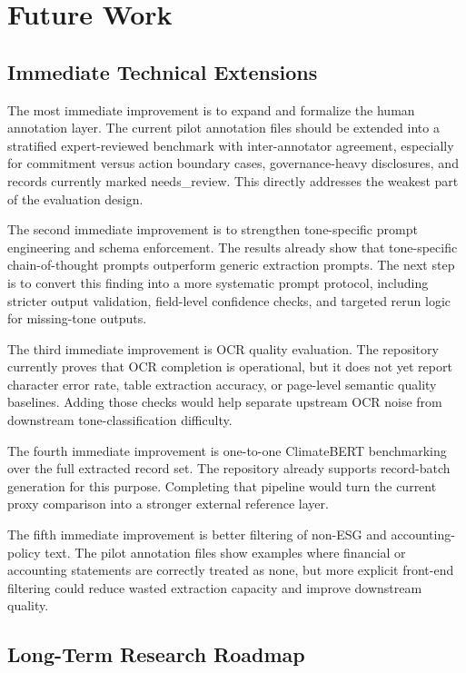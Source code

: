 \documentclass[english, online, cse, master]{dithesis}
\begin{document}
\section{Future Work}
\subsection{Immediate Technical Extensions}

The most immediate improvement is to expand and formalize the human annotation layer. The current pilot annotation files should be extended into a stratified expert-reviewed benchmark with inter-annotator agreement, especially for commitment versus action boundary cases, governance-heavy disclosures, and records currently marked needs\_review. This directly addresses the weakest part of the evaluation design.

The second immediate improvement is to strengthen tone-specific prompt engineering and schema enforcement. The results already show that tone-specific chain-of-thought prompts outperform generic extraction prompts. The next step is to convert this finding into a more systematic prompt protocol, including stricter output validation, field-level confidence checks, and targeted rerun logic for missing-tone outputs.

The third immediate improvement is OCR quality evaluation. The repository currently proves that OCR completion is operational, but it does not yet report character error rate, table extraction accuracy, or page-level semantic quality baselines. Adding those checks would help separate upstream OCR noise from downstream tone-classification difficulty.

The fourth immediate improvement is one-to-one ClimateBERT benchmarking over the full extracted record set. The repository already supports record-batch generation for this purpose. Completing that pipeline would turn the current proxy comparison into a stronger external reference layer.

The fifth immediate improvement is better filtering of non-ESG and accounting-policy text. The pilot annotation files show examples where financial or accounting statements are correctly treated as none, but more explicit front-end filtering could reduce wasted extraction capacity and improve downstream quality.

\subsection{Long-Term Research Roadmap}
\end{document}
